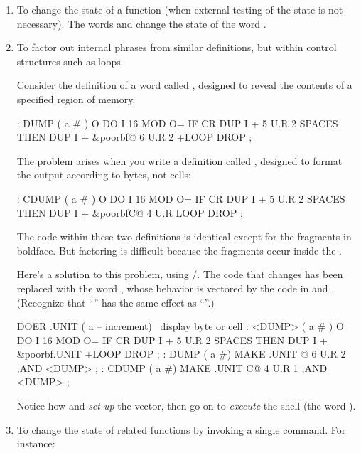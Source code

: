 \begin{enumerate}
\item To change the state of a function (when external testing of the
state is not necessary). The words  and 
change the state of the word .

\item To factor out internal phrases from similar definitions, but within
control structures such as loops.

Consider the definition of a word called , designed to reveal the
contents of a specified region of memory.

\begin{Code}[commandchars=\&\{\}]
: DUMP  ( a # )
   O DO  I 16 MOD O= IF  CR  DUP I +  5 U.R  2 SPACES  THEN
   DUP I +  &poorbf{@ 6 U.R  2 +LOOP}  DROP ;
\end{Code}
The problem arises when you write a definition called ,
designed to format the output according to bytes, not cells:

\begin{Code}[commandchars=\&\{\}]
: CDUMP  ( a # )
   O DO  I 16 MOD O= IF  CR  DUP I +  5 U.R  2 SPACES  THEN
   DUP I +  &poorbf{C@  4 U.R  LOOP} DROP ;
\end{Code}

The code within these two definitions is identical except for the
fragments in boldface. But factoring is difficult because the fragments
occur inside the .

Here's a solution to this problem, using /. The
code that changes has been replaced with the word , whose
behavior is vectored by the code in  and .
(Recognize that ``'' has the same effect as
``''.)

\begin{Code}[commandchars=\&\{\}]
DOER .UNIT ( a -- increment)  \ display byte or cell
: <DUMP>  ( a # )
   O DO  I 16 MOD O= IF  CR  DUP I +  5 U.R  2 SPACES  THEN
   DUP I + &poorbf{.UNIT}  +LOOP  DROP ;
: DUMP   ( a #)  MAKE .UNIT  @  6 U.R  2 ;AND <DUMP> ;
: CDUMP ( a #)   MAKE .UNIT C@  4 U.R  1 ;AND <DUMP> ;
\end{Code}
Notice how  and  \emph{set-up} the vector,
then go on to \emph{execute} the shell (the word ).

\item To change the state of related functions by invoking a single
command. For instance:


\end{enumerate}
